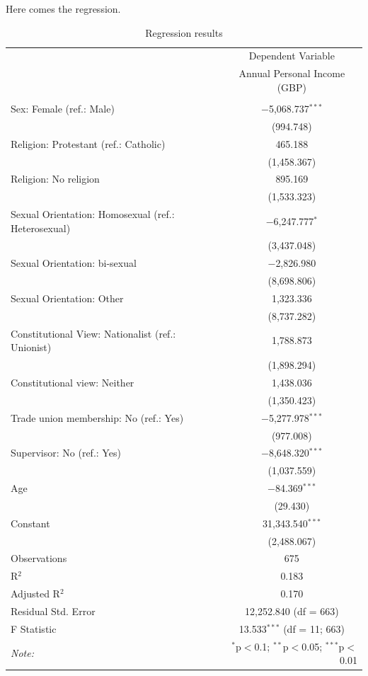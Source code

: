 \documentclass[
]{article}
\begin{document}
Here comes the regression.

\begin{table}[H] \centering 
  \caption{Regression results} 
  \label{} 
\small 
\begin{tabular}{@{\hspace{5pt}}l@{\hspace{5pt}}c} 
\toprule 
 & \multicolumn{1}{c}{Dependent Variable} \\ 
\cmidrule(rr){2-2} 
 & Annual Personal Income (GBP) \\ 
\midrule  
\\[-2.1ex] Sex: Female (ref.: Male) & $-$5,068.737$^{***}$ \\ 
  & (994.748) \\ 
 \addlinespace 
 Religion: Protestant (ref.: Catholic) & 465.188 \\ 
  & (1,458.367) \\ 
 \addlinespace 
 Religion: No religion & 895.169 \\ 
  & (1,533.323) \\ 
 \addlinespace 
 Sexual Orientation: Homosexual (ref.: Heterosexual) & $-$6,247.777$^{*}$ \\ 
  & (3,437.048) \\ 
 \addlinespace 
 Sexual Orientation: bi-sexual & $-$2,826.980 \\ 
  & (8,698.806) \\ 
 \addlinespace 
 Sexual Orientation: Other & 1,323.336 \\ 
  & (8,737.282) \\ 
 \addlinespace 
 Constitutional View: Nationalist (ref.: Unionist) & 1,788.873 \\ 
  & (1,898.294) \\ 
 \addlinespace 
 Constitutional view: Neither & 1,438.036 \\ 
  & (1,350.423) \\ 
 \addlinespace 
 Trade union membership: No (ref.: Yes) & $-$5,277.978$^{***}$ \\ 
  & (977.008) \\ 
 \addlinespace 
 Supervisor: No (ref.: Yes) & $-$8,648.320$^{***}$ \\ 
  & (1,037.559) \\ 
 \addlinespace 
 Age & $-$84.369$^{***}$ \\ 
  & (29.430) \\ 
 \addlinespace 
 Constant & 31,343.540$^{***}$ \\ 
  & (2,488.067) \\ 
 \addlinespace 
\midrule  
Observations & 675 \\ 
R$^{2}$ & 0.183 \\ 
Adjusted R$^{2}$ & 0.170 \\ 
Residual Std. Error & 12,252.840 (df = 663) \\ 
F Statistic & 13.533$^{***}$ (df = 11; 663) \\ 
\bottomrule 
\textit{Note:}  & \multicolumn{1}{r}{$^{*}$p$<$0.1; $^{**}$p$<$0.05; $^{***}$p$<$0.01} \\ 
\end{tabular} 
\end{table}
\end{document}

